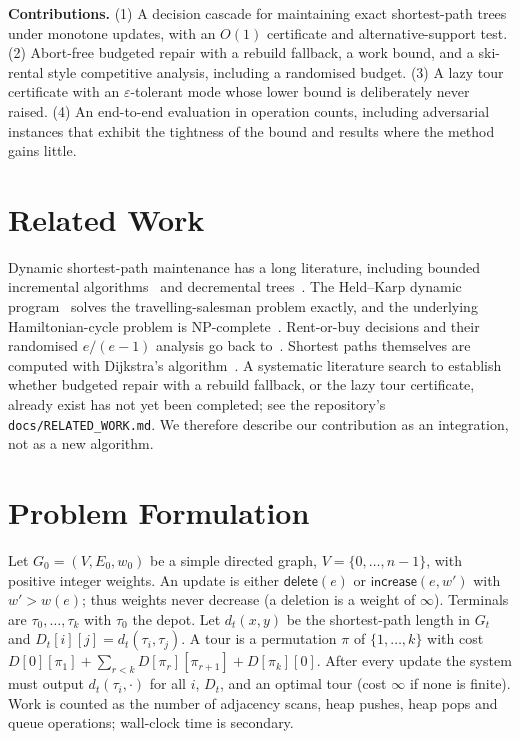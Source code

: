 \documentclass[conference]{IEEEtran}
\begin{document}
\textbf{Contributions.} (1) A decision cascade for maintaining exact shortest-path trees under monotone updates, with an $O(1)$ certificate and alternative-support test.
(2) Abort-free budgeted repair with a rebuild fallback, a work bound, and a ski-rental style competitive analysis, including a randomised budget.
(3) A lazy tour certificate with an $\varepsilon$-tolerant mode whose lower bound is deliberately never raised.
(4) An end-to-end evaluation in operation counts, including adversarial instances that exhibit the tightness of the bound and results where the method gains little.

\section{Related Work}
Dynamic shortest-path maintenance has a long literature, including bounded incremental algorithms~\cite{ramalingam1996} and decremental trees~\cite{evenshiloach1981}.
The Held--Karp dynamic program~\cite{heldkarp1962} solves the travelling-salesman problem exactly, and the underlying Hamiltonian-cycle problem is NP-complete~\cite{karp1972}.
Rent-or-buy decisions and their randomised $e/(e-1)$ analysis go back to~\cite{karlin1994}.
Shortest paths themselves are computed with Dijkstra's algorithm~\cite{dijkstra1959}.
A systematic literature search to establish whether budgeted repair with a rebuild fallback, or the lazy tour certificate, already exist has not yet been completed; see the repository's \texttt{docs/RELATED\_WORK.md}. We therefore describe our contribution as an integration, not as a new algorithm.

\section{Problem Formulation}
Let $G_0=(V,E_0,w_0)$ be a simple directed graph, $V=\{0,\dots,n-1\}$, with positive integer weights.
An update is either $\textsf{delete}(e)$ or $\textsf{increase}(e,w')$ with $w'>w(e)$; thus weights never decrease (a deletion is a weight of $\infty$).
Terminals are $\tau_0,\dots,\tau_k$ with $\tau_0$ the depot. Let $d_t(x,y)$ be the shortest-path length in $G_t$ and $D_t[i][j]=d_t(\tau_i,\tau_j)$.
A tour is a permutation $\pi$ of $\{1,\dots,k\}$ with cost $D[0][\pi_1]+\sum_{r<k}D[\pi_r][\pi_{r+1}]+D[\pi_k][0]$.
After every update the system must output $d_t(\tau_i,\cdot)$ for all $i$, $D_t$, and an optimal tour (cost $\infty$ if none is finite).
Work is counted as the number of adjacency scans, heap pushes, heap pops and queue operations; wall-clock time is secondary.
\end{document}
